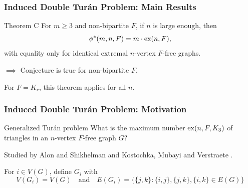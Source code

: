 \documentclass{beamer}
\newcommand*{\ex}{\textnormal{ex}}
\begin{document}
\begin{frame}
  \frametitle{Induced Double Turán Problem: Main Results}


  \begin{block}{Theorem C}
    For $m \geq 3$ and non-bipartite $F$, if $n$ is large enough, then
    \[
      \phi^*(m, n, F) = m \cdot \ex(n, F),
    \]
    with equality only for identical extremal $n$-vertex $F$-free graphs.
  \end{block}

  \pause

  $\implies$ Conjecture is true for non-bipartite $F$.

  \pause

  \vspace{0.5cm}

  For $F = K_r$, this theorem applies for all $n$.
\end{frame}

\begin{frame}
  \frametitle{Induced Double Turán Problem: Motivation}

  \begin{block}{Generalized Turán problem}
    What is the maximum number $\ex(n, F, K_3)$ of triangles in an $n$-vertex $F$-free graph $G$?
  \end{block}

  Studied by Alon and Shikhelman \cite{AlonShikhelman2016} and Kostochka, Mubayi and Verstraete \cite{KostochkaMubayiV2015,MubayiMukherjee2023,MubayiV2016}.

  \pause 

  \vspace{0.7cm}

  For $i \in V(G)$, define $G_i$ with
  \[
    V(G_i) = V(G) \quad \text{and} \quad E(G_i) = \{\{j, k\} : \{i, j\}, \{j, k\}, \{i, k\} \in E(G)\}
  \]
\end{frame}
\end{document}
